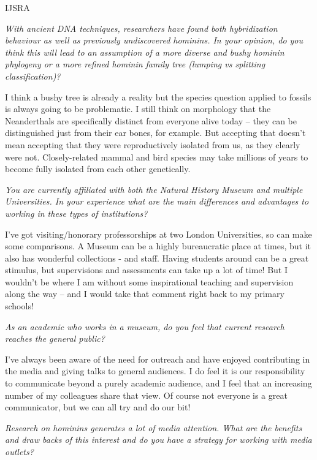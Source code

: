\documentclass{ijsra}
\begin{document}
\begin{labeling}{IJSRA}
\item[IJSRA]
\emph{With ancient DNA techniques, researchers have found both hybridization behaviour as well as
previously undiscovered hominins.
In your opinion, do you think this will lead to an assumption of a more diverse and bushy hominin phylogeny or
a more refined hominin family tree (lumping vs splitting classification)?}

\item[CS]
I think a bushy tree is already a reality but the species question applied to fossils is always going to be problematic.
I still think on morphology that the Neanderthals are specifically distinct from everyone alive today – they can be
distinguished just from their ear bones, for example.
But accepting that doesn’t mean accepting that they were reproductively isolated from us, as they clearly were not.
Closely-related mammal and bird species may take millions of years to become fully isolated from each other genetically.

\item[IJSRA]
\emph{You are currently affiliated with both the Natural History Museum and multiple Universities.
In your experience what are the main differences and advantages to working in these types of institutions?}

\item[CS]
I’ve got visiting/honorary professorships at two London Universities, so can make some comparisons.
A Museum can be a highly bureaucratic place at times, but it also has wonderful collections - and staff.
Having students around can be a great stimulus, but supervisions and assessments can take up a lot of time!
But I wouldn’t be where I am without some inspirational teaching and supervision along the way – and
I would take that comment right back to my primary schools!

\item[IJSRA]
\emph{As an academic who works in a museum, do you feel that current research reaches the general public?}

\item[CS]
I’ve always been aware of the need for outreach and have enjoyed contributing in the media and
giving talks to general audiences.
I do feel it is our responsibility to communicate beyond a purely academic audience, and I feel that an increasing number of
my colleagues share that view. 
Of course not everyone is a great communicator, but we can all try and do our bit!

\item[IJSRA]
\emph{Research on hominins generates a lot of media attention.
What are the benefits and draw backs of this interest and do you have a strategy for working with media outlets?}


\end{labeling}
\end{document}
